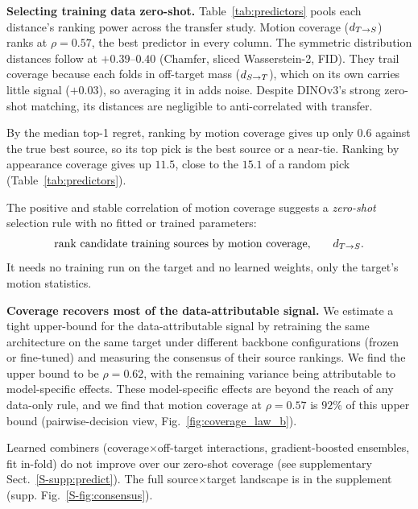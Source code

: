 \noindent\textbf{Selecting training data zero-shot.}
\label{sec:predict}
Table~\ref{tab:predictors} pools each distance's ranking power across the transfer
study. Motion coverage ($\dbt$) ranks at $\rho{=}0.57$, the best predictor in every
column. The symmetric distribution distances follow at $+0.39$--$0.40$ (Chamfer,
sliced Wasserstein-2, FID). They trail coverage because each folds in off-target mass
($\dtb$), which on its own carries little signal ($+0.03$), so averaging it in adds
noise. Despite DINOv3's strong zero-shot matching, its distances are negligible to
anti-correlated with transfer.

By the median top-1 regret, ranking by motion coverage gives up only $0.6$ \pck{}
against the true best source, so its top pick is the best source or a near-tie.
Ranking by appearance coverage gives up $11.5$, close to the $15.1$ of a random pick
(Table~\ref{tab:predictors}).

\begin{table}[tbp]
\centering
\caption{\textbf{Pooled results for appearance and motion distances, with median
regret.} Within-context Spearman $\rho$ between peak \pck{} (at $\alpha{=}5\%$) and each
negated distance, split by target stratum and pooled. Five distances (coverage $\dbt$,
off-target $\dtb$, Chamfer, sliced $W_2$, FID) computed in both appearance (DINO) and
motion (BFV) space. \emph{Regret} $=$ median \pck{} that ranking sources by the distance
surrenders against an oracle best-source pick (lower is better). \textbf{Bold} $=$ best
per column (highest $\rho$, lowest regret). The \emph{Random} row is the negative
control, with expected Spearman $0$ by construction and the regret of a random source
pick.}
\label{tab:predictors}
\small
\setlength{\tabcolsep}{3pt}

\end{table}

The positive and stable correlation of motion coverage suggests a \emph{zero-shot}
selection rule with no fitted or trained parameters:
\begin{equation}
\text{rank candidate training sources by motion coverage,}\qquad d_{T\to S} .
\label{eq:rule}
\end{equation}
It needs no training run on the target and no learned weights, only the target's motion
statistics.

\noindent\textbf{Coverage recovers most of the data-attributable signal.} We estimate a
tight upper-bound for the data-attributable signal by retraining the same architecture on
the same target under different backbone configurations (frozen or fine-tuned) and measuring the consensus of their source rankings. We find the upper bound to be $\rho{=}0.62$, with the remaining variance being attributable to model-specific effects. These model-specific effects are beyond the
reach of any data-only rule, and we find that motion coverage at $\rho{=}0.57$ is $92\%$ of this upper bound
(pairwise-decision view, Fig.~\ref{fig:coverage_law_b}).

Learned combiners (coverage$\times$off-target interactions, gradient-boosted
ensembles, fit in-fold) do not improve over our zero-shot coverage
(see supplementary Sect.~\ref{S-supp:predict}). The full
source$\times$target landscape is in the supplement (supp. Fig.~\ref{S-fig:consensus}).
